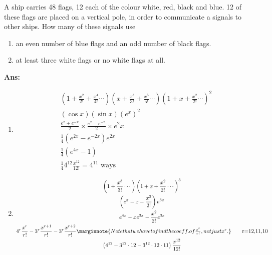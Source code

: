 \begin{example}
    A ship carries 48 flags, 12 each of the colour white, red, black and blue. 12 of these flags are placed on a vertical pole, in order to communicate a signals to other ships. How many of these signals use\begin{enumerate}
        \item an even number of blue flags and an odd number of black flags.
        \item at least three white flags or no white flags at all.
    \end{enumerate}
    \textbf{Ans:}\begin{enumerate}
        \item \begin{gather*}
                  \left(1 + \frac{x^2}{2!} + \frac{x^4}{4!} \cdots \right) \left(x + \frac{x^3}{3!} + \frac{x^5}{5!}\cdots\right) {\left(1 + x +\frac{x^2}{2!} \cdots\right)}^2\\
                  (\cos x) (\sin x) {(e^x)}^2 \\
                  \frac{e^x + e^{ - x}}{2} \times  \frac{e^x - e^{-x}}{2} \times  e^2x\\
                  \frac{1}{4} (e^{2x} - e^{ - 2x}) e^{2x}\\
                  \frac{1}{4} (e^{4x} - 1) \tag*{r = 12}\\
                  \frac{1}{4} 4^{12} \frac{x^{12}}{12!} = 4^{11} \text{ ways}
              \end{gather*}

        \item \begin{gather*}
                  \left( 1 + \frac{x^{3}}{3!} \cdots \right) {\left( 1 + x + \frac{x^{2}}{2!} \cdots \right)}^3\\
                  \left( e^x - x - \frac{x^2}{2!}\right) e^{3x}\\
                  e^{4x} - xe^{3x} - \frac{x^2}{2!} e^{3x} \\
                  4^r \frac{x^r}{r!} - 3^r \frac{x^{r+1}}{r!} - 3^r \frac{x^{r+2}}{r!} \marginnote{Note that we have to find the coeff. of \mbox{\(\frac{x^r}{r!}\)}, not just \mbox{\(x^r\)}.} \tag*{r=12,11,10} \\
                  \left( 4^{12} - 3^{12} \cdot 12 - 3^{12} \cdot 12 \cdot 11  \right) \frac{x^{12}}{12!} 
              \end{gather*}
    \end{enumerate}
\end{example}
